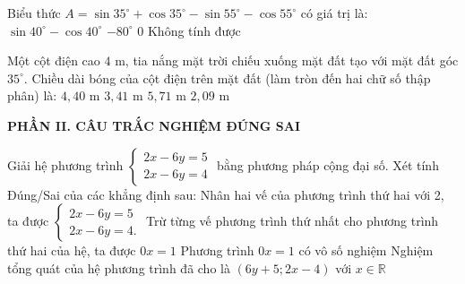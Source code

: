 \documentclass[12pt,a4paper]{article}
\begin{document}
\begin{ex}
Biểu thức $A = \sin 35^\circ + \cos 35^\circ - \sin 55^\circ - \cos 55^\circ$ có giá trị là:
\choice
{$\sin 40^\circ - \cos 40^\circ$}
{$-80^\circ$}
{\True $0$}
{Không tính được}
\end{ex}

\begin{ex}
Một cột điện cao $4\text{ m}$, tia nắng mặt trời chiếu xuống mặt đất tạo với mặt đất góc $35^\circ$. Chiều dài bóng của cột điện trên mặt đất (làm tròn đến hai chữ số thập phân) là:
\choice
{$4{,}40\text{ m}$}
{$3{,}41\text{ m}$}
{\True $5{,}71\text{ m}$}
{$2{,}09\text{ m}$}
\end{ex}


\setcounter{ex}{0}
\noindent\textbf{\large PHẦN II. CÂU TRẮC NGHIỆM ĐÚNG SAI}
\vspace{1mm}
\begin{ex}
Giải hệ phương trình $\begin{cases} 2x - 6y = 5 \\ 2x - 6y = 4 \end{cases}$ bằng phương pháp cộng đại số. Xét tính Đúng/Sai của các khẳng định sau:
\choiceTF
{Nhân hai vế của phương trình thứ hai với 2, ta được $\begin{cases} 2x - 6y = 5 \\ 2x - 6y = 4. \end{cases}$}
{\True Trừ từng vế phương trình thứ nhất cho phương trình thứ hai của hệ, ta được $0x = 1$}
{Phương trình $0x = 1$ có vô số nghiệm}
{Nghiệm tổng quát của hệ phương trình đã cho là $(6y + 5; 2x - 4)$ với $x \in \mathbb{R}$}
\end{ex}
\end{document}
